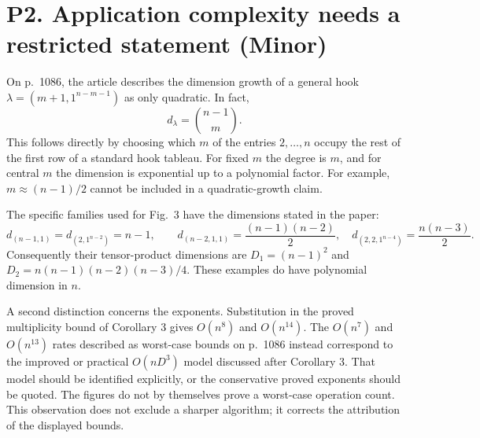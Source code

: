 \documentclass[10pt]{article}
\begin{document}
\section*{P2. Application complexity needs a restricted statement (Minor)}
On p. 1086, the article describes the dimension growth of a general hook \(\lambda=(m+1,1^{n-m-1})\) as only quadratic. In fact, \[d_\lambda=\binom{n-1}{m}.\] This follows directly by choosing which \(m\) of the entries \(2,\ldots,n\) occupy the rest of the first row of a standard hook tableau. For fixed \(m\) the degree is \(m\), and for central \(m\) the dimension is exponential up to a polynomial factor. For example, \(m\approx(n-1)/2\) cannot be included in a quadratic-growth claim.\par
The specific families used for Fig. 3 have the dimensions stated in the paper: \[d_{(n-1,1)}=d_{(2,1^{n-2})}=n-1,\qquad
 d_{(n-2,1,1)}=\frac{(n-1)(n-2)}2,\quad
 d_{(2,2,1^{n-4})}=\frac{n(n-3)}2.\] Consequently their tensor-product dimensions are \(D_1=(n-1)^2\) and \(D_2=n(n-1)(n-2)(n-3)/4\). These examples do have polynomial dimension in \(n\).\par
A second distinction concerns the exponents. Substitution in the proved multiplicity bound of Corollary 3 gives \(O(n^8)\) and \(O(n^{14})\). The \(O(n^7)\) and \(O(n^{13})\) rates described as worst-case bounds on p. 1086 instead correspond to the improved or practical \(O(nD^3)\) model discussed after Corollary 3. That model should be identified explicitly, or the conservative proved exponents should be quoted. The figures do not by themselves prove a worst-case operation count. This observation does not exclude a sharper algorithm; it corrects the attribution of the displayed bounds.\par
\end{document}
